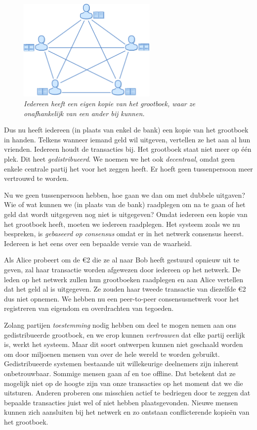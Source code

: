 \documentclass[smalldemyvopaper,11pt,twoside,onecolumn,openright,extrafontsizes]{memoir}
\begin{document}
\begin{figure}
    \centering
    \includegraphics[width=0.6\textwidth]{images/fig3.png}
    \caption{\footnotesize{\textit{Iedereen heeft een eigen kopie van het grootboek, waar ze onafhankelijk van een ander bij kunnen.}}}
    \label{fig3}
\end{figure}

Dus nu heeft iedereen (in plaats van enkel de bank) een kopie van het grootboek in handen. Telkens wanneer iemand geld wil uitgeven, vertellen ze het aan al hun vrienden. Iedereen houdt de transacties bij. Het grootboek staat niet meer op één plek. Dit heet \textit{gedistribueerd}. We noemen we het ook \textit{decentraal}, omdat geen enkele centrale partij het voor het zeggen heeft. Er hoeft geen tussenpersoon meer vertrouwd te worden.


Nu we geen tussenpersoon hebben, hoe gaan we dan om met dubbele uitgaven? Wie of wat kunnen we (in plaats van de bank) raadplegen om na te gaan of het geld dat wordt uitgegeven nog niet is uitgegeven? Omdat iedereen een kopie van het grootboek heeft, moeten we iedereen raadplegen. Het systeem zoals we nu bespreken, is \textit{gebaseerd op consensus} omdat er in het netwerk consensus heerst. Iedereen is het eens over een bepaalde versie van de waarheid.

Als Alice probeert om de €2 die ze al naar Bob heeft gestuurd opnieuw uit te geven, zal haar transactie worden afgewezen door iedereen op het netwerk. De leden op het netwerk zullen hun grootboeken raadplegen en aan Alice vertellen dat het geld al is uitgegeven. Ze zouden haar tweede transactie van diezelfde €2 dus niet opnemen. We hebben nu een peer-to-peer consensusnetwerk voor het registreren van eigendom en overdrachten van tegoeden.

Zolang partijen \textit{toestemming} nodig hebben om deel te mogen nemen aan ons gedistribueerde grootboek, en we erop kunnen \textit{vertrouwen} dat elke partij eerlijk is, werkt het systeem. Maar dit soort ontwerpen kunnen niet geschaald worden om door miljoenen mensen van over de hele wereld te worden gebruikt. Gedistribueerde systemen bestaande uit willekeurige deelnemers zijn inherent onbetrouwbaar. Sommige mensen gaan af en toe offline. Dat betekent dat ze mogelijk niet op de hoogte zijn van onze transacties op het moment dat we die uitsturen. Anderen proberen ons misschien actief te bedriegen door te zeggen dat bepaalde transacties juist wel of niet hebben plaatsgevonden. Nieuwe mensen kunnen zich aansluiten bij het netwerk en zo ontstaan conflicterende kopieën van het grootboek.
\end{document}
